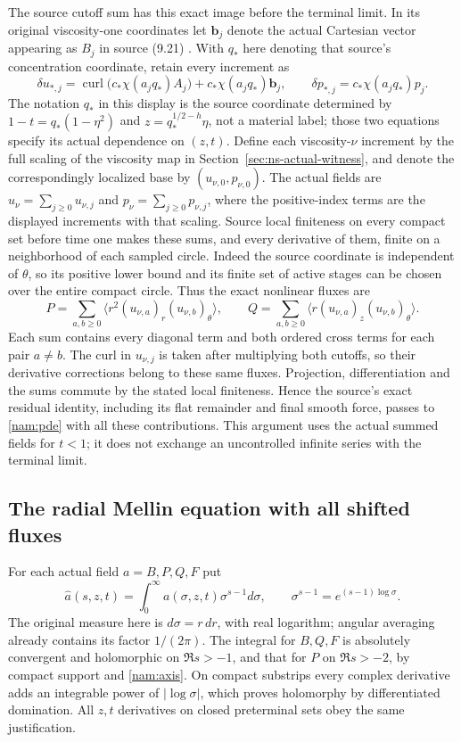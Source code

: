 The source cutoff sum has this exact image before the terminal limit.
In its original viscosity-one coordinates let
$\mathbf b_j$ denote the actual Cartesian vector appearing as $B_j$
in source (9.21) \cite[p.~115]{openaiNS2026release}. With $q_*$ here denoting that source's concentration
coordinate, retain every increment as
\[
 \delta u_{*,j}=\operatorname{curl}
          \bigl(c_*\chi(a_jq_*)A_j\bigr)
                  +c_*\chi(a_jq_*)\mathbf b_j,
 \qquad
 \delta p_{*,j}=c_*\chi(a_jq_*)p_j.
\]
The notation $q_*$ in this display is the source coordinate determined
by $1-t=q_*(1-\eta^2)$ and $z=q_*^{1/2-h}\eta$, not a material
label; those two equations specify its actual dependence on $(z,t)$.
Define each viscosity-$\nu$ increment by the full scaling of the
viscosity map in Section~\ref{sec:ns-actual-witness}, and denote
the correspondingly localized base by
$(u_{\nu,0},p_{\nu,0})$. The actual fields are
$u_\nu=\sum_{j\geq0}u_{\nu,j}$ and
$p_\nu=\sum_{j\geq0}p_{\nu,j}$, where the positive-index terms are
the displayed increments with that scaling. Source local finiteness
on every compact set before time one makes these sums, and every
derivative of them, finite on a neighborhood of each sampled circle.
Indeed the source coordinate is independent of $\theta$, so its
positive lower bound and its finite set of active stages can be
chosen over the entire compact circle. Thus the exact nonlinear fluxes
are
\[
 P=\sum_{a,b\geq0}\langle r^2(u_{\nu,a})_r(u_{\nu,b})_\theta\rangle,
 \qquad
 Q=\sum_{a,b\geq0}\langle r(u_{\nu,a})_z(u_{\nu,b})_\theta\rangle.
\]
Each sum contains every diagonal term and both ordered cross terms
for each pair $a\ne b$. The curl in $u_{\nu,j}$ is taken after
multiplying both cutoffs, so their derivative corrections belong to
these same fluxes. Projection, differentiation and the sums commute
by the stated local finiteness. Hence the source's exact residual
identity, including its flat remainder and final smooth force,
passes to \eqref{nam:pde} with all these contributions. This argument
uses the actual summed fields for $t<1$; it does not exchange an
uncontrolled infinite series with the terminal limit.

\subsection{The radial Mellin equation with all shifted fluxes}

For each actual field $a=B,P,Q,F$ put
\[
 \widehat a(s,z,t)=\int_0^\infty a(\sigma,z,t)\sigma^{s-1}d\sigma,
 \qquad \sigma^{s-1}=e^{(s-1)\log\sigma}.
\]
The original measure here is $d\sigma=r\,dr$, with real logarithm;
angular averaging already contains its factor $1/(2\pi)$.
The integral for $B,Q,F$ is absolutely convergent and holomorphic on
$\Re s>-1$, and that for $P$ on $\Re s>-2$, by compact support
and \eqref{nam:axis}. On compact substrips every complex derivative
adds an integrable power of $|\log\sigma|$, which proves
holomorphy by differentiated domination. All $z,t$ derivatives on
closed preterminal sets obey the same justification.

